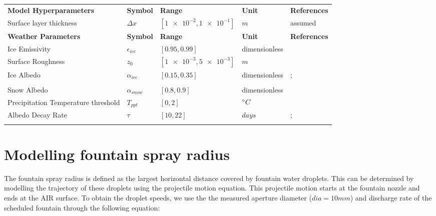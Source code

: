 \documentclass[tc, manuscript]{copernicus}
\begin{document}
\begin{table}
\begin{tabular}{lllll}
		\textbf{Model Hyperparameters} & \textbf{Symbol} & \textbf{Range} & \textbf{Unit} & \textbf{References} \\
    Surface layer thickness             & $\Delta x$            & $[\num{1e-2},\num{1e-1}]$           & $m$ & assumed
    \\\midrule
		\textbf{Weather Parameters} & \textbf{Symbol} & \textbf{Range} & \textbf{Unit} & \textbf{References} \\
    Ice Emissivity                      & $\epsilon_{ice}$      & $[0.95,0.99]$         & dimensionless & \citet{horiInsituMeasuredSpectral2006}             \\
    Surface Roughness                   & $z_0$                 & $[\num{1e-3},\num{5e-3}]$            & $m$  & \citet{brockMeasurementParameterizationAerodynamic2006}       \\
    Ice Albedo                          & $\alpha_{ice}$        & $[0.15,0.35]$         & dimensionless  &
    \citet{steinerModellingIcecliffBackwasting2015};            \\
    & &    &  & \citet{zollesRobustUncertaintyAssessment2019}      \\
    Snow Albedo                         & $\alpha_{snow}$       & $[0.8,0.9]$        & dimensionless  & \citet{zollesRobustUncertaintyAssessment2019}              \\
    Precipitation Temperature threshold & $T_{ppt}$             & $[0,2]$            & $^{\circ} C$& \citet{shichangResponseZhadangGlacier2010}  \\
    Albedo Decay Rate                   & $\tau$                & $[10,22]$           & $days$ &
    \citet{schmidtImportanceAccurateGlacier2017};      \\
    & &    &  & \citet{oerlemansYearRecordGlobal1998}      \\\midrule
	\end{tabular}
\end{table}
\clearpage

\section{Modelling fountain spray radius} \label{sec:r_F}

The fountain spray radius is defined as the largest horizontal distance covered by fountain water droplets. This
can be determined by modelling the trajectory of these droplets using the projectile motion equation. This
projectile motion starts at the fountain nozzle and ends at the AIR surface.  To obtain the droplet speeds, we
use the the measured aperture diameter ($dia = 10 mm$) and discharge rate of the scheduled fountain  through the
following equation:
\end{document}
